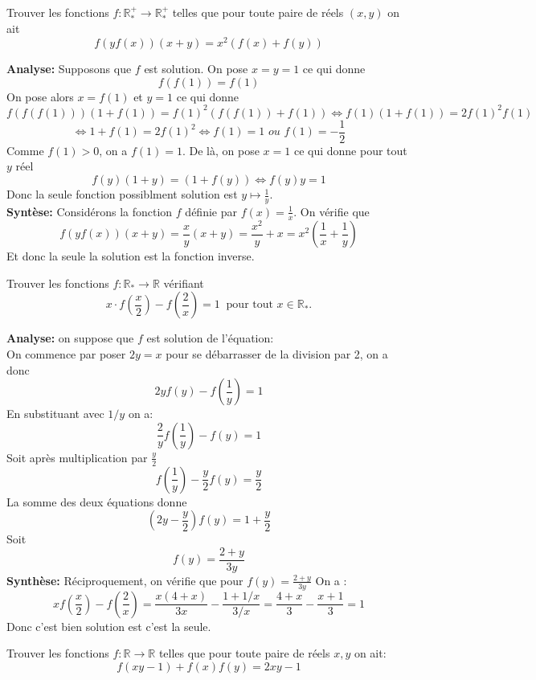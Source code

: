 \begin{exo}[M]
Trouver les fonctions $f:\mathbb{R}_*^+\to \mathbb{R}_*^+$ telles que pour toute paire de réels $(x,y)$ on ait
$$f(yf(x))(x+y)=x^2(f(x)+f(y)) $$

\end{exo}
\begin{preuve}
\textbf{Analyse:} Supposons que $f$ est solution. On pose $x=y=1$ ce qui donne 
$$f(f(1))=f(1) $$
On pose alors $x=f(1)$ et $y=1$ ce qui donne 
$$f(f(f(1)))(1+f(1))=f(1)^2(f(f(1))+f(1))\iff f(1)(1+f(1))=2f(1)^2f(1)$$ $$\iff 1+f(1)=2f(1)^2\iff f(1)=1 \textit{ ou } f(1)=-\frac{1}{2} $$
Comme $f(1)>0$, on a $f(1)=1$. De là, on pose $x=1$ ce qui donne pour tout $y$ réel
$$f(y)(1+y)=(1+f(y))\iff f(y)y=1 $$
Donc la seule fonction possiblment solution est $y\mapsto \frac{1}{y}$.
\\
\textbf{Syntèse:}
Considérons la fonction $f$ définie par $f(x)=\frac{1}{x}$. On vérifie que $$f(yf(x))(x+y)=\frac{x}{y}(x+y)=\frac{x^2}{y}+x=x^2\left(\frac{1}{x}+ \frac{1}{y}\right) $$
Et donc la seule la solution est la fonction inverse.
\end{preuve}
\begin{exo}[M]
Trouver les fonctions $f:\mathbb{R}_*\to \mathbb{R}$ vérifiant
$$x \cdot f\left(\frac{x}{2}\right) - f\left(\frac{2}{x}\right) = 1 \ \text{ pour tout } x \in \mathbb{R}_*. $$
\end{exo}
\begin{preuve}
\textbf{Analyse:} on suppose que $f$ est solution de l'équation:
\\

On commence par poser $2y=x$ pour se débarrasser de la division par 2, on a donc
$$2yf(y)-f\left(\frac{1}{y}\right)=1$$
En substituant avec $1/y$ on a:
$$\frac{2}{y}f\left(\frac{1}{y}\right)-f(y)=1$$
Soit après multiplication par $\frac{y}{2}$
$$f\left(\frac{1}{y}\right)-\frac{y}{2}f(y)=\frac{y}{2}$$
La somme des deux équations donne
$$\left(2y-\frac{y}{2}\right)f(y)=1+\frac{y}{2}$$
Soit $$f(y)=\frac{2+y}{3y}$$
\textbf{Synthèse:}
Réciproquement, on vérifie que
pour $f(y)=\frac{2+y}{3y}$
On a :
$$xf\left(\frac{x}{2}\right)-f\left(\frac{2}{x}\right)=\frac{x(4+x)}{3x}-\frac{1+1/x}{3/x}=\frac{4+x}{3}-\frac{x+1}{3}=1$$
Donc c'est bien solution est c'est la seule. 
\end{preuve}

\begin{exo}[D]
Trouver les fonctions $f:\mathbb{R}\to \mathbb{R}$ telles que pour toute paire de réels $x,y$ on ait:
$$f(xy-1)+f(x)f(y)=2xy-1 $$
\end{exo}

